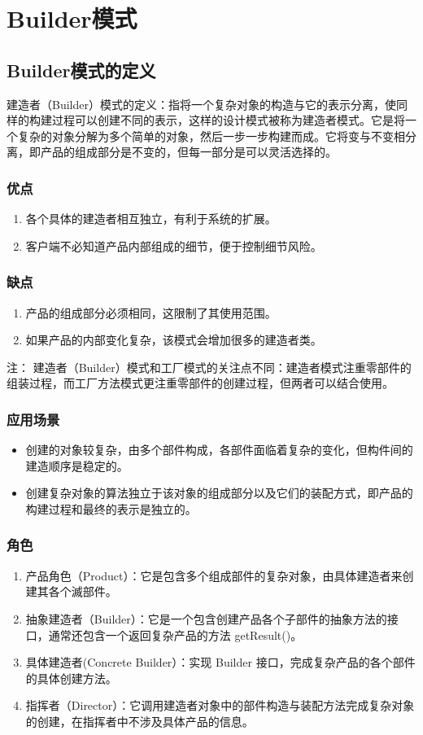 \chapter{Builder模式}
\section{Builder模式的定义}
建造者（Builder）模式的定义：指将一个复杂对象的构造与它的表示分离，使同样的构建过程可以创建不同的表示，这样的设计模式被称为建造者模式。它是将一个复杂的对象分解为多个简单的对象，然后一步一步构建而成。它将变与不变相分离，即产品的组成部分是不变的，但每一部分是可以灵活选择的。
\subsection{优点}
\begin{enumerate}
	\item 各个具体的建造者相互独立，有利于系统的扩展。
	\item 客户端不必知道产品内部组成的细节，便于控制细节风险。
\end{enumerate}
\subsection{缺点}
\begin{enumerate}
	\item 产品的组成部分必须相同，这限制了其使用范围。
	\item 如果产品的内部变化复杂，该模式会增加很多的建造者类。
\end{enumerate}
注：
建造者（Builder）模式和工厂模式的关注点不同：建造者模式注重零部件的组装过程，而工厂方法模式更注重零部件的创建过程，但两者可以结合使用。
\subsection{应用场景}
\begin{itemize}
	\item 创建的对象较复杂，由多个部件构成，各部件面临着复杂的变化，但构件间的建造顺序是稳定的。
	\item 创建复杂对象的算法独立于该对象的组成部分以及它们的装配方式，即产品的构建过程和最终的表示是独立的。
\end{itemize}
\subsection{角色}
\begin{enumerate}
	\item 产品角色（Product）：它是包含多个组成部件的复杂对象，由具体建造者来创建其各个滅部件。
	\item 抽象建造者（Builder）：它是一个包含创建产品各个子部件的抽象方法的接口，通常还包含一个返回复杂产品的方法 getResult()。
	\item 具体建造者(Concrete Builder）：实现 Builder 接口，完成复杂产品的各个部件的具体创建方法。
	\item 指挥者（Director）：它调用建造者对象中的部件构造与装配方法完成复杂对象的创建，在指挥者中不涉及具体产品的信息。
\end{enumerate}
